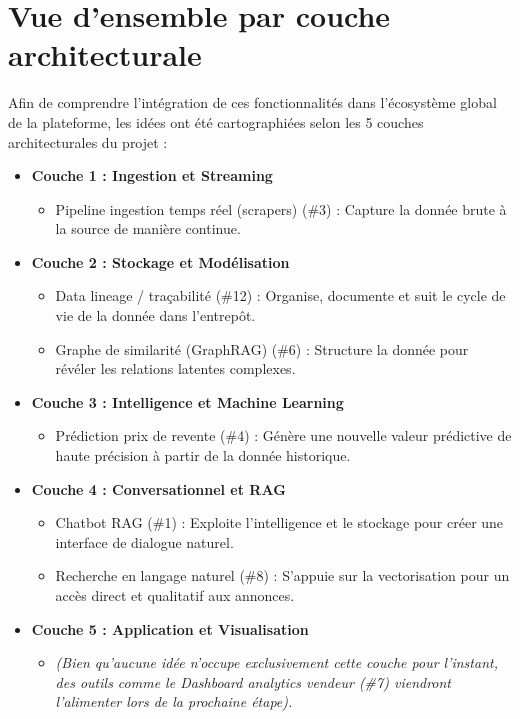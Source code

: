 \documentclass[11pt,a4paper]{article}
\begin{document}
\newpage
\section{Vue d'ensemble par couche architecturale}
Afin de comprendre l'intégration de ces fonctionnalités dans l'écosystème global de la plateforme, les idées ont été cartographiées selon les 5 couches architecturales du projet :

\begin{itemize}
    \item \textbf{Couche 1 : Ingestion et Streaming}
    \begin{itemize}
        \item Pipeline ingestion temps réel (scrapers) (\#3) : Capture la donnée brute à la source de manière continue.
    \end{itemize}
    
    \item \textbf{Couche 2 : Stockage et Modélisation}
    \begin{itemize}
        \item Data lineage / traçabilité (\#12) : Organise, documente et suit le cycle de vie de la donnée dans l'entrepôt.
        \item Graphe de similarité (GraphRAG) (\#6) : Structure la donnée pour révéler les relations latentes complexes.
    \end{itemize}
    
    \item \textbf{Couche 3 : Intelligence et Machine Learning}
    \begin{itemize}
        \item Prédiction prix de revente (\#4) : Génère une nouvelle valeur prédictive de haute précision à partir de la donnée historique.
    \end{itemize}
    
    \item \textbf{Couche 4 : Conversationnel et RAG}
    \begin{itemize}
        \item Chatbot RAG (\#1) : Exploite l'intelligence et le stockage pour créer une interface de dialogue naturel.
        \item Recherche en langage naturel (\#8) : S'appuie sur la vectorisation pour un accès direct et qualitatif aux annonces.
    \end{itemize}
    
    \item \textbf{Couche 5 : Application et Visualisation}
    \begin{itemize}
        \item \textit{(Bien qu'aucune idée n'occupe exclusivement cette couche pour l'instant, des outils comme le Dashboard analytics vendeur (\#7) viendront l'alimenter lors de la prochaine étape).}
    \end{itemize}
\end{itemize}
\end{document}
